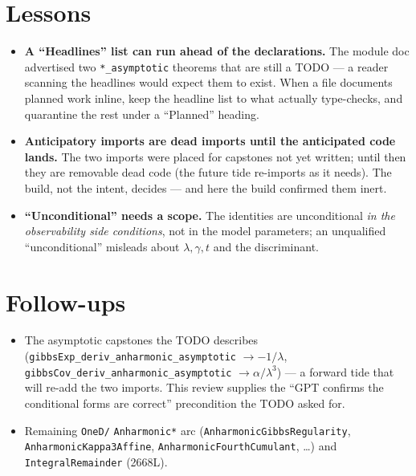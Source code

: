 \documentclass[11pt]{article}
\begin{document}
\section{Lessons}
\begin{itemize}[noitemsep]
  \item \textbf{A ``Headlines'' list can run ahead of the declarations.} The module doc advertised
    two \texttt{*\_asymptotic} theorems that are still a TODO --- a reader scanning the headlines
    would expect them to exist. When a file documents planned work inline, keep the headline list to
    what actually type-checks, and quarantine the rest under a ``Planned'' heading.
  \item \textbf{Anticipatory imports are dead imports until the anticipated code lands.} The two
    imports were placed for capstones not yet written; until then they are removable dead code (the
    future tide re-imports as it needs). The build, not the intent, decides --- and here the build
    confirmed them inert.
  \item \textbf{``Unconditional'' needs a scope.} The identities are unconditional \emph{in the
    observability side conditions}, not in the model parameters; an unqualified ``unconditional''
    misleads about $\lambda,\gamma,t$ and the discriminant.
\end{itemize}

\section{Follow-ups}
\begin{itemize}[noitemsep]
  \item The asymptotic capstones the TODO describes (\texttt{gibbsExp\_deriv\_anharmonic\_asymptotic}
    $\to-1/\lambda$, \texttt{gibbsCov\_deriv\_anharmonic\_asymptotic} $\to\alpha/\lambda^3$) --- a
    forward tide that will re-add the two imports. This review supplies the ``GPT confirms the
    conditional forms are correct'' precondition the TODO asked for.
  \item Remaining \texttt{OneD/} \texttt{Anharmonic*} arc (\texttt{AnharmonicGibbsRegularity},
    \texttt{AnharmonicKappa3Affine}, \texttt{AnharmonicFourthCumulant}, \dots) and
    \texttt{IntegralRemainder} (2668L).
\end{itemize}
\end{document}

